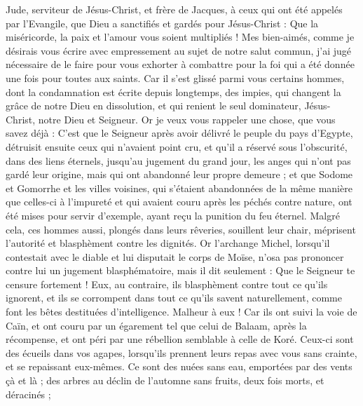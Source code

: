 \begin{multicols}{2}
\VerseOne{}Jude, serviteur de Jésus-Christ, et frère de Jacques, à ceux qui ont été appelés par l'Evangile, que Dieu a sanctifiés et gardés pour Jésus-Christ :
Que la miséricorde, la paix et l'amour vous soient multipliés !
Mes bien-aimés, comme je désirais vous écrire avec empressement au sujet de notre salut commun, j'ai jugé nécessaire de le faire pour vous exhorter à combattre pour la foi qui a été donnée une fois pour toutes aux saints.
Car il s'est glissé parmi vous certains hommes, dont la condamnation est écrite depuis longtemps, des impies, qui changent la grâce de notre Dieu en dissolution, et qui renient le seul dominateur, Jésus-Christ, notre Dieu et Seigneur.
Or je veux vous rappeler une chose, que vous savez déjà : C'est que le Seigneur après avoir délivré le peuple du pays d'Egypte, détruisit ensuite ceux qui n'avaient point cru,
et qu'il a réservé sous l'obscurité, dans des liens éternels, jusqu'au jugement du grand jour, les anges qui n'ont pas gardé leur origine, mais qui ont abandonné leur propre demeure ;
et que Sodome et Gomorrhe et les villes voisines, qui s'étaient abandonnées de la même manière que celles-ci à l'impureté et qui avaient couru après les péchés contre nature, ont été mises pour servir d'exemple, ayant reçu la punition du feu éternel. 
Malgré cela, ces hommes aussi, plongés dans leurs rêveries, souillent leur chair, méprisent l'autorité et blasphèment contre les dignités.
Or l'archange Michel, lorsqu'il contestait avec le diable et lui disputait le corps de Moïse, n'osa pas prononcer contre lui un jugement blasphématoire, mais il dit seulement : Que le Seigneur te censure fortement !
Eux, au contraire, ils blasphèment contre tout ce qu'ils ignorent, et ils se corrompent dans tout ce qu'ils savent naturellement, comme font les bêtes destituées d'intelligence.
Malheur à eux ! Car ils ont suivi la voie de Caïn, et ont couru par un égarement tel que celui de Balaam, après la récompense, et ont péri par une rébellion semblable à celle de Koré.
Ceux-ci sont des écueils dans vos agapes, lorsqu'ils prennent leurs repas avec vous sans crainte, et se repaissant eux-mêmes. Ce sont des nuées sans eau, emportées par des vents çà et là ; des arbres au déclin de l'automne sans fruits, deux fois morts, et déracinés ;

\end{multicols}
